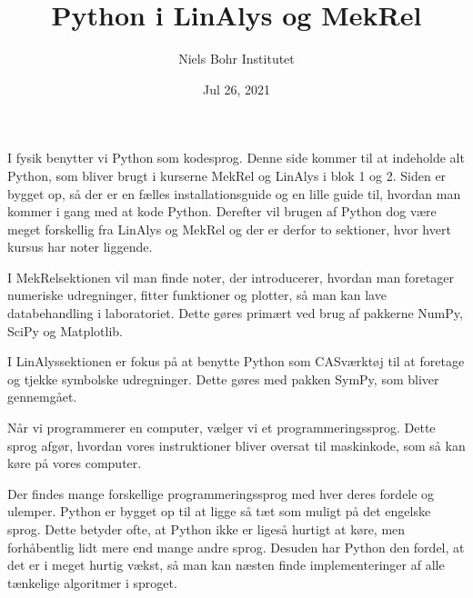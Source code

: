 \documentclass[letterpaper,10pt,english]{jupyterBook}
\title{Python i LinAlys og MekRel}
\date{Jul 26, 2021}
\author{Niels Bohr Institutet}
\begin{document}
\pagestyle{empty}
\sphinxmaketitle
\pagestyle{plain}
\sphinxtableofcontents
\pagestyle{normal}
\label{\detokenize{intro::doc}}





I fysik benytter vi Python som kodesprog. Denne side kommer til at indeholde alt Python, som bliver brugt i kurserne MekRel og LinAlys i blok 1 og 2. Siden er bygget op, så der er en fælles installationsguide og en lille guide til, hvordan man kommer i gang med at kode Python. Derefter vil brugen af Python dog være meget forskellig fra LinAlys og MekRel og der er derfor to sektioner, hvor hvert kursus har noter liggende.

I MekRel\sphinxhyphen{}sektionen vil man finde noter, der introducerer, hvordan man foretager numeriske udregninger, fitter funktioner og plotter, så man kan lave databehandling i laboratoriet. Dette gøres primært ved brug af pakkerne NumPy, SciPy og Matplotlib.

I LinAlys\sphinxhyphen{}sektionen er fokus på at benytte Python som CAS\sphinxhyphen{}værktøj til at foretage og tjekke symbolske udregninger. Dette gøres med pakken SymPy, som bliver gennemgået.

\begin{DUlineblock}{0em}
\item[] 
\end{DUlineblock}

Når vi programmerer en computer, vælger vi et programmeringssprog. Dette sprog afgør, hvordan vores instruktioner bliver oversat til maskinkode, som så kan køre på vores computer.

Der findes mange forskellige programmeringssprog med hver deres fordele og ulemper. Python er bygget op til at ligge så tæt som muligt på det engelske sprog.  Dette betyder ofte, at Python ikke er ligeså hurtigt at køre, men forhåbentlig lidt mere  end mange andre sprog. Desuden har Python den fordel, at det er i meget hurtig vækst, så man kan næsten finde implementeringer af alle tænkelige algoritmer i sproget.

\begin{DUlineblock}{0em}
\item[] 
\end{DUlineblock}
\end{document}
